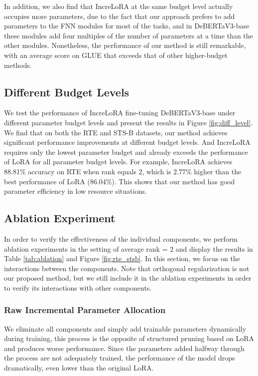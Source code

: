 In addition, we also find that IncreLoRA at the same budget level actually occupies more parameters, due to the fact that our approach prefers to add parameters to the FNN modules for most of the tasks, and in DeBERTaV3-base these modules add four multiples of the number of parameters at a time than the other modules. Nonetheless, the performance of our method is still remarkable, with an average score on GLUE that exceeds that of other higher-budget methods.

\subsection{Different Budget Levels} We test the performance of IncreLoRA fine-tuning DeBERTaV3-base under different parameter budget levels and present the results in Figure \ref{fig:diff_level}. We find that on both the RTE and STS-B datasets, our method achieves significant performance improvements at different budget levels. And IncreLoRA requires only the lowest parameter budget and already exceeds the performance of LoRA for all parameter budget levels. For example, IncreLoRA achieves 88.81\% accuracy on RTE when rank equals 2, which is 2.77\% higher than the best performance of LoRA (86.04\%). This shows that our method has good parameter efficiency in low resource situations.

\subsection{Ablation Experiment} In order to verify the effectiveness of the individual components, we perform ablation experiments in the setting of average rank = 2 and display the results in Table \ref{tab:ablation} and Figure \ref{fig:rte_stsb}. In this section, we focus on the interactions between the components. Note that orthogonal regularization is not our proposed method, but we still include it in the ablation experiments in order to verify its interactions with other components.
\subsubsection{Raw Incremental Parameter Allocation} We eliminate all components and simply add trainable parameters dynamically during training, this process is the opposite of structured pruning based on LoRA and produces worse performance. Since the parameters added halfway through the process are not adequately trained, the performance of the model drops dramatically, even lower than the original LoRA.

